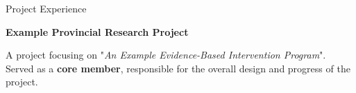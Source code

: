 \begin{rubric}{Project Experience}

\entry*[2024]
    \textbf{Example Provincial Research Project}
    \par A project focusing on "\textit{An Example Evidence-Based Intervention Program}". Served as a \textbf{core member}, responsible for the overall design and progress of the project.
%
\end{rubric}

